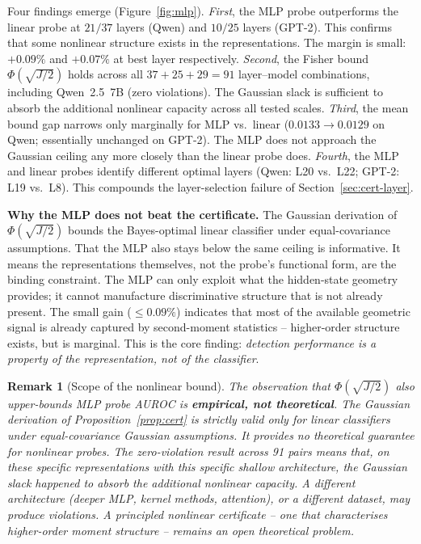\documentclass[10pt,twocolumn]{article}
\newtheorem{remark}{Remark}
\begin{document}
Four findings emerge (Figure~\ref{fig:mlp}).
\textit{First}, the MLP probe outperforms the linear probe at $21/37$
layers (Qwen) and $10/25$ layers (GPT-2). This confirms that some
nonlinear structure exists in the representations. The margin is small:
$+0.09\%$ and $+0.07\%$ at best layer respectively.
\textit{Second}, the Fisher bound $\Phi(\sqrt{J/2})$ holds across all
$37 + 25 + 29 = 91$ layer--model combinations, including Qwen~2.5~7B
(zero violations). The Gaussian slack is sufficient to absorb the
additional nonlinear capacity across all tested scales.
\textit{Third}, the mean bound gap narrows only marginally for MLP
vs.\ linear ($0.0133 \to 0.0129$ on Qwen; essentially unchanged on
GPT-2). The MLP does not approach the Gaussian ceiling any more closely
than the linear probe does.
\textit{Fourth}, the MLP and linear probes identify different optimal
layers (Qwen: L20 vs.\ L22; GPT-2: L19 vs.\ L8). This compounds the
layer-selection failure of Section~\ref{sec:cert-layer}.

\textbf{Why the MLP does not beat the certificate.}
The Gaussian derivation of $\Phi(\sqrt{J/2})$ bounds the Bayes-optimal
linear classifier under equal-covariance assumptions. That the MLP also
stays below the same ceiling is informative. It means the
representations themselves, not the probe's functional form, are the
binding constraint. The MLP can only exploit what the hidden-state
geometry provides; it cannot manufacture discriminative structure that
is not already present. The small gain ($\leq 0.09\%$) indicates that
most of the available geometric signal is already captured by
second-moment statistics -- higher-order structure exists, but is
marginal. This is the core finding: \emph{detection performance is a
property of the representation, not of the classifier}.

\begin{remark}[Scope of the nonlinear bound]
The observation that $\Phi(\sqrt{J/2})$ also upper-bounds MLP probe
AUROC is \textbf{empirical, not theoretical}. The Gaussian derivation of
Proposition~\ref{prop:cert} is strictly valid only for linear
classifiers under equal-covariance Gaussian assumptions. It provides no
theoretical guarantee for nonlinear probes. The zero-violation result
across 91 pairs means that, on these specific representations with this
specific shallow architecture, the Gaussian slack happened to absorb
the additional nonlinear capacity. A different architecture (deeper
MLP, kernel methods, attention), or a different dataset, may produce
violations. A principled nonlinear certificate -- one that
characterises higher-order moment structure -- remains an open
theoretical problem.
\end{remark}
\end{document}
